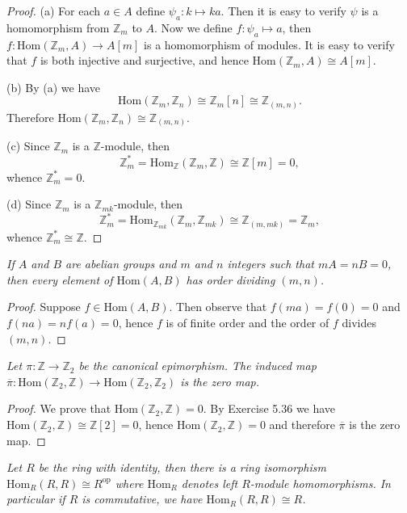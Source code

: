 \begin{proof}
(a) For each $a\in A$ define $\psi_a:k\mapsto ka$. Then it is easy to verify $\psi$ is a homomorphism from $\mathbb{Z}_m$ to $A$. Now we define $f:\psi_a\mapsto a$, then $f:\mathrm{Hom}(\mathbb{Z}_m,A)\to A[m]$ is a homomorphism of modules. It is easy to verify that $f$ is both injective and surjective, and hence $\mathrm{Hom}(\mathbb{Z}_m,A)\cong A[m]$.\par
(b) By (a) we have 
$$
\mathrm{Hom}\left( \mathbb{Z} _m,\mathbb{Z} _n \right) \cong \mathbb{Z} _m\left[ n \right] \cong \mathbb{Z} _{\left( m,n \right)}.
$$
Therefore $\mathrm{Hom}(\mathbb{Z}_m,\mathbb{Z}_n)\cong\mathbb{Z}_{(m,n)}$.\par
(c) Since $\mathbb{Z}_m$ is a $\mathbb{Z}$-module, then 
$$
\mathbb{Z} _{m}^{*}=\mathrm{Hom}_{\mathbb{Z}}\left( \mathbb{Z} _m,\mathbb{Z} \right) \cong \mathbb{Z} \left[ m \right] =0,
$$
whence $\mathbb{Z}_m^*=0$.\par
(d) Since $\mathbb{Z}_m$ is a $\mathbb{Z}_{mk}$-module, then 
$$
\mathbb{Z} _{m}^{*}=\mathrm{Hom}_{\mathbb{Z} _{mk}}\left( \mathbb{Z} _m,\mathbb{Z} _{mk} \right) \cong \mathbb{Z} _{\left( m,mk \right)}=\mathbb{Z} _m,
$$
whence $\mathbb{Z}_m^*\cong\mathbb{Z}$.
\end{proof}
\begin{problem}\em
If $A$ and $B$ are abelian groups and $m$ and $n$ integers such that $mA=nB=0$, then every element of $\mathrm{Hom}(A,B)$ has order dividing $(m,n)$.
\end{problem}
\begin{proof}
Suppose $f\in\mathrm{Hom}(A,B)$. Then observe that $f(ma)=f(0)=0$ and $f(na)=nf(a)=0$, hence $f$ is of finite order and the order of $f$ divides $(m,n)$.
\end{proof}
\begin{problem}\em
Let $\pi:\mathbb{Z}\to\mathbb{Z}_2$ be the canonical epimorphism. The induced map $\overline{\pi}:\mathrm{Hom}(\mathbb{Z}_2,\mathbb{Z})\to\mathrm{Hom}(\mathbb{Z}_2,\mathbb{Z}_2)$ is the zero map.
\end{problem}
\begin{proof}
We prove that $\mathrm{Hom}(\mathbb{Z}_2,\mathbb{Z})=0$. By Exercise 5.36 we have $\mathrm{Hom}(\mathbb{Z}_2,\mathbb{Z})\cong\mathbb{Z}[2]=0$, hence $\mathrm{Hom}(\mathbb{Z}_2,\mathbb{Z})=0$ and therefore $\overline{\pi}$ is the zero map.
\end{proof}
\begin{problem}\em
Let $R$ be the ring with identity, then there is a ring isomorphism $\mathrm{Hom}_R(R,R)\cong R^{\mathrm{op}}$ where $\mathrm{Hom}_R$ denotes left $R$-module homomorphisms. In particular if $R$ is commutative, we have $\mathrm{Hom}_R(R,R)\cong R$.
\end{problem}
